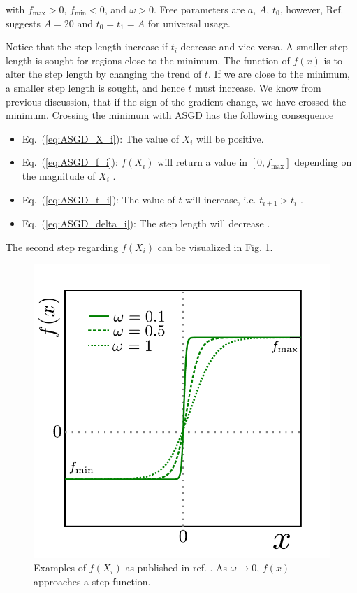 with $f_\mathrm{max} > 0$, $f_\mathrm{min} < 0$, and $\omega > 0$. Free parameters are $a$, $A$, $t_0$, however, Ref. \cite{ASGD} suggests $A=20$ and $t_0=t_1=A$ for universal usage.

Notice that the step length increase if $t_i$ decrease and vice-versa. A smaller step length is sought for regions close to the minimum. The function of $f(x)$ is to alter the step length by changing the trend of $t$. If we are close to the minimum, a smaller step length is sought, and hence $t$ must increase. We know from previous discussion, that if the sign of the gradient change, we have crossed the minimum. Crossing the minimum with ASGD has the following consequence

\begin{itemize}
 \item Eq.~(\ref{eq:ASGD_X_i}): The value of $X_i$ will be positive.
 \item Eq.~(\ref{eq:ASGD_f_i}): $f(X_i)$ will return a value in $[0, f_\mathrm{max}]$ depending on the magnitude of $X_i$ .
 \item Eq.~(\ref{eq:ASGD_t_i}): The value of $t$ will increase, i.e. $t_{i+1} > t_i$ .
 \item Eq.~(\ref{eq:ASGD_delta_i}): The step length will decrease .
\end{itemize}

The second step regarding $f(X_i)$ can be visualized in Fig. \ref{fig:f_ASGD}.

\begin{figure}
 \begin{center}
  \includegraphics[scale=0.75]{../Graphics/ASGD_f.pdf}
  \caption{Examples of $f(X_i)$ as published in ref. \cite{ASGD}. As $\omega\to0$, $f(x)$ approaches a step function.}
  \label{fig:f_ASGD}
 \end{center}
\end{figure}


